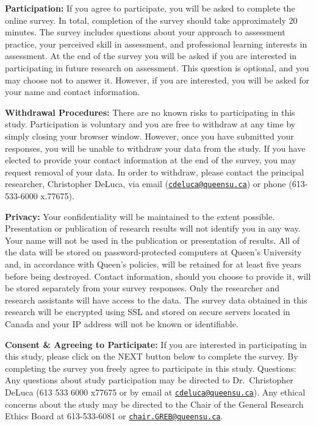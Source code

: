 \documentclass[
]{book}
\begin{document}
\textbf{Participation:} If you agree to participate, you will be asked to complete the online survey. In total, completion of the survey should take approximately 20 minutes. The survey includes questions about your approach to assessment practice, your perceived skill in assessment, and professional learning interests in assessment. At the end of the survey you will be asked if you are interested in participating in future research on assessment. This question is optional, and you may choose not to answer it. However, if you are interested, you will be asked for your name and contact information.

\textbf{Withdrawal Procedures:} There are no known risks to participating in this study. Participation is voluntary and you are free to withdraw at any time by simply closing your browser window. However, once you have submitted your responses, you will be unable to withdraw your data from the study. If you have elected to provide your contact information at the end of the survey, you may request removal of your data. In order to withdraw, please contact the principal researcher, Christopher DeLuca, via email (\href{mailto:cdeluca@queensu.ca}{\nolinkurl{cdeluca@queensu.ca}}) or phone (613-533-6000 x.77675).

\textbf{Privacy:} Your confidentiality will be maintained to the extent possible. Presentation or publication of research results will not identify you in any way. Your name will not be used in the publication or presentation of results. All of the data will be stored on password-protected computers at Queen's University and, in accordance with Queen's policies, will be retained for at least five years before being destroyed. Contact information, should you choose to provide it, will be stored separately from your survey responses. Only the researcher and research assistants will have access to the data. The survey data obtained in this research will be encrypted using SSL and stored on secure servers located in Canada and your IP address will not be known or identifiable.

\textbf{Consent \& Agreeing to Participate:} If you are interested in participating in this study, please click on the NEXT button below to complete the survey. By completing the survey you freely agree to participate in this study.
Questions: Any questions about study participation may be directed to Dr.~Christopher DeLuca (613 533 6000 x77675 or by email at \href{mailto:cdeluca@queensu.ca}{\nolinkurl{cdeluca@queensu.ca}}). Any ethical concerns about the study may be directed to the Chair of the General Research Ethics Board at 613-533-6081 or \href{mailto:chair.GREB@queensu.ca}{\nolinkurl{chair.GREB@queensu.ca}}.
\end{document}
